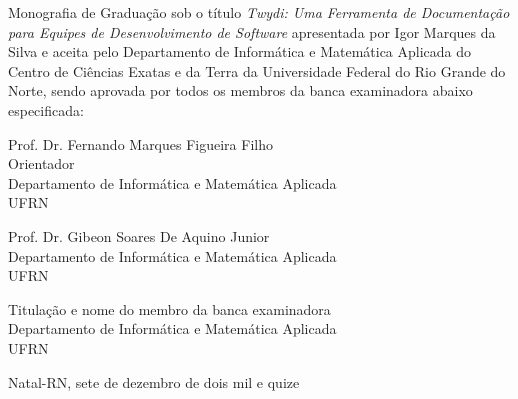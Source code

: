 \begin{folhadeaprovacao}
	\setlength{\ABNTsignthickness}{0.4pt}
	\setlength{\ABNTsignwidth}{10cm}

	\noindent
	Monografia de Graduação sob o título \textit{Twydi: Uma Ferramenta de Documentação para Equipes de Desenvolvimento de Software} apresentada por
	Igor Marques da Silva e aceita pelo Departamento de Informática e Matemática Aplicada do
	Centro de Ciências Exatas e da Terra da Universidade Federal do Rio Grande do Norte,
	sendo aprovada por todos os membros da banca examinadora abaixo especificada:

	\assinatura
	{
		Prof. Dr. Fernando Marques Figueira Filho\\
		{\small Orientador} 															\\
		{\footnotesize
			Departamento de Informática e Matemática Aplicada 																	\\
		  	UFRN
		}
	}

	\assinatura
	{
		Prof. Dr. Gibeon Soares De Aquino Junior						 \\
		{\footnotesize
			Departamento de Informática e Matemática Aplicada 																	\\
		  	UFRN
		}
	}

	\assinatura
	{
		Titulação e nome do membro da banca examinadora 						 \\
		{\footnotesize
			Departamento de Informática e Matemática Aplicada 																	\\
		  	UFRN
		}
	}

	\vfill

	\begin{center}
		Natal-RN, sete de dezembro de dois mil e quize
	\end{center}
\end{folhadeaprovacao}
